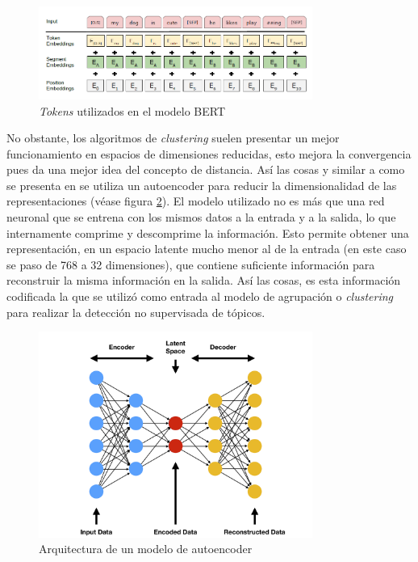 \begin{figure}[H]
    \centering
    \includegraphics[width=0.8\textwidth]{doc_hw04/images/BERT_Tokens.png}
    \caption{\textit{Tokens} utilizados en el modelo BERT}
    \label{fig:BERT_Tokens}
\end{figure}

No obstante, los algoritmos de \textit{clustering} suelen presentar un mejor funcionamiento en espacios de dimensiones reducidas, esto mejora la convergencia pues da una mejor idea del concepto de distancia. Así las cosas y similar a como se presenta en \cite{DeepRepresentationClusteringTweets} se utiliza un autoencoder para reducir la dimensionalidad de las representaciones (véase figura \ref{fig:autoencoder}). El modelo utilizado no es más que una red neuronal que se entrena con los mismos datos a la entrada y a la salida, lo que internamente comprime y descomprime la información. Esto permite obtener una representación, en un espacio latente mucho menor al de la entrada (en este caso se paso de 768 a 32 dimensiones), que contiene suficiente información para reconstruir la misma información en la salida. Así las cosas, es esta información codificada la que se utilizó como entrada al modelo de agrupación o \textit{clustering} para realizar la detección no supervisada de tópicos.

\begin{figure}[H]
    \centering
    \includegraphics[width=0.8\textwidth]{doc_hw04/images/autoencoder.png}
    \caption{Arquitectura de un modelo de autoencoder}
    \label{fig:autoencoder}
\end{figure}

